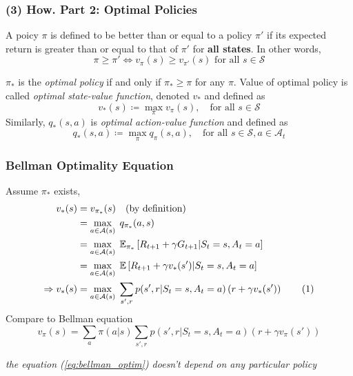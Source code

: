 \documentclass[10pt]{beamer}
\theoremstyle{remark}
\newcommand\numberthis{\addtocounter{equation}{1}\tag{\theequation}} %
\begin{document}
\begin{frame}
    \frametitle{(3) How. Part 2: Optimal Policies}
    \begin{definition}
        A poicy $\pi$ is defined to be better than or equal to a policy $\pi'$ if its expected return is greater than or equal to that of  $\pi'$ for \textbf{all states}. In other words, 
        \[
        \pi \geq \pi' \Leftrightarrow v_\pi(s) \geq v_{\pi'} (s)  \text{ for all $s \in \mathcal{S}$} 
    \] 
    \end{definition}
    \begin{definition}
        $\pi_{\ast}$ is the \textit{optimal policy} if and only if $\pi_\ast \geq \pi$ for any  $\pi$. Value of optimal policy is called \textit{optimal state-value function}, denoted $v_\ast$ and defined as 
         \[
             v_\ast(s) \coloneqq \max_{\pi} v_\pi(s), \quad \text{for all } s \in \mathcal{S}
        \] 
        Similarly, $q_\ast(s, a)$ is \textit{optimal action-value function} and defined as
         \[
             q_\ast(s, a) \coloneqq \max_{\pi} q_\pi(s, a), \quad \text{for  all } s \in \mathcal{S}, a \in \mathcal{A}_t
        \] 
    \end{definition}
\end{frame}

\begin{frame}
    \frametitle{Bellman Optimality Equation}
    Assume $\pi_\ast$ exists,
    \begin{align*}
        v_{\ast} (s) 
        &= v_{\pi_\ast}(s) \quad \text{(by definition)}\\
        &= \max_{a \in \mathcal{A}(s)} \; q_{\pi_\ast}(a, s) \\
        &= \max_{a \in \mathcal{A}(s)} \; \mathbb{E}_{\pi_\ast} \left[ R_{t+1} + \gamma G_{t+1}| S_t = s, A_t = a \right] \\
          &= \max_{a \in \mathcal{A}(s)} \; \mathbb{E} \left[ R_{t+1} + \gamma v_{\ast} (s')| S_t = s, A_t = a \right] \\
        \Rightarrow v_{\ast}(s) &= \max_{a \in \mathcal{A}(s)} \; \sum_{s', r} p(s', r|  S_t =s, A_t = a)  \left( r + \gamma v_{\ast} (s') \right) \numberthis \label{eq:bellman_optim}
    \end{align*}
    Compare to Bellman equation 
    \begin{equation*}
         v_\pi(s) = \sum_{a} \pi(a|s) \sum_{s', r} p(s', r| S_t = s, A_t = a) \left( r + \gamma v_\pi(s') \right) 
    \end{equation*}

    \textit{the equation (\ref{eq:bellman_optim}) doesn't depend on any particular policy}
\end{frame}
\end{document}
